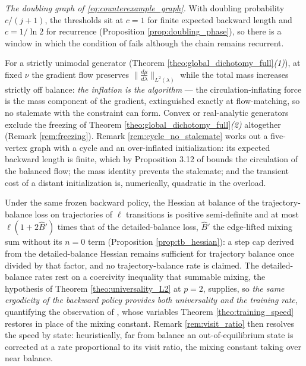 \emph{The doubling graph of \eqref{eq:counterexample_graph}.} With doubling probability
$c/(j+1)$, the thresholds sit at $c=1$ for finite expected backward length and $c=1/\ln 2$ for
recurrence (Proposition \ref{prop:doubling_phase}), so there is a window in which the condition
of \citet{morozov2025revisiting} fails although the chain remains recurrent.

For a strictly unimodal generator (Theorem \ref{theo:global_dichotomy_full}\emph{(1)}), at fixed $\nu$ the gradient flow preserves $\|\frac{d\mu}{d\lambda}\|_{L^2(\lambda)}$ while the total mass increases strictly off balance: \emph{the inflation is the algorithm} --- the circulation-inflating force is the mass component of the gradient, extinguished exactly at flow-matching, so no stalemate with the constraint can form. Convex or real-analytic generators exclude the freezing of Theorem \ref{theo:global_dichotomy_full}\emph{(2)} altogether (Remark \ref{rem:freezing}). Remark \ref{rem:cycle_no_stalemate} works out a five-vertex graph with a cycle and an over-inflated initialization: its expected backward length is finite, which by Proposition 3.12 of \citet{morozov2025revisiting} bounds the circulation of the balanced flow; the mass identity prevents the stalemate; and the transient cost of a distant initialization is, numerically, quadratic in the overload.

Under the same frozen backward policy, the Hessian at balance of the trajectory-balance loss on trajectories of $\ell$ transitions is positive semi-definite and at most $\ell(1+2\widehat B')$ times that of the detailed-balance loss, $\widehat B'$ the edge-lifted mixing sum without its $n=0$ term (Proposition \ref{prop:tb_hessian}): a step cap derived from the detailed-balance Hessian remains sufficient for trajectory balance once divided by that factor, and no trajectory-balance rate is claimed. The detailed-balance rates rest on a coercivity inequality that summable mixing, the hypothesis of Theorem \ref{theo:universality_L2} at $p=2$, supplies, so \emph{the same ergodicity of the backward policy provides both universality and the training rate}, quantifying the observation of \citet{morozov2025revisiting}, whose variables Theorem \ref{theo:training_speed} restores in place of the mixing constant. Remark \ref{rem:visit_ratio} then resolves the speed by state: heuristically, far from balance an out-of-equilibrium state is corrected at a rate proportional to its visit ratio, the mixing constant taking over near balance.

